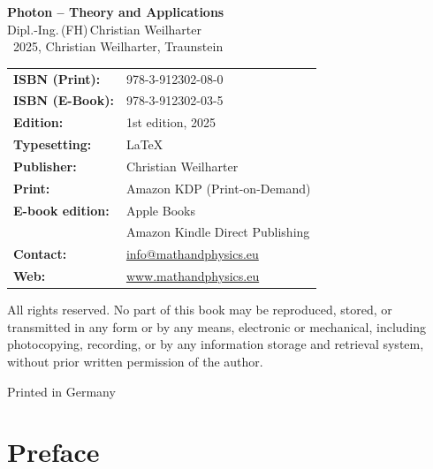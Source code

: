 \cleardoublepage
\thispagestyle{empty}
\begin{center}
	
	{\Large\textbf{Photon – Theory and Applications}}\\[1.2em]
	{\large Dipl.-Ing.\,(FH)\,Christian Weilharter}\\[1.2em]
	\textcopyright~2025, Christian Weilharter, Traunstein\\[2em]
\end{center}

\begin{flushleft}
	\begin{tabular}{@{}l l}
		\textbf{ISBN (Print):} & 978-3-912302-08-0 \\[0.5em]
		\textbf{ISBN (E-Book):} & 978-3-912302-03-5 \\[0.5em]
		\textbf{Edition:} & 1st edition, 2025 \\[0.5em]
		\textbf{Typesetting:} & \LaTeX \\[0.5em]
		\textbf{Publisher:} & Christian Weilharter \\[0.5em]

		\textbf{Print:} & Amazon KDP (Print-on-Demand) \\[0.5em]
		\textbf{E-book edition:} & Apple Books \\[0.5em]
		& Amazon Kindle Direct Publishing \\[0.5em]
		\textbf{Contact:} & \href{mailto:info@mathandphysics.de}{info@mathandphysics.eu} \\[0.5em]
		\textbf{Web:} & \href{https://www.mathandphysics.de}{www.mathandphysics.eu} \\

	\end{tabular}
\end{flushleft}

\vspace{2em}
\noindent
All rights reserved. No part of this book may be reproduced, stored, or transmitted
in any form or by any means, electronic or mechanical, including photocopying,
recording, or by any information storage and retrieval system, without prior written
permission of the author.

\begin{center}\small Printed in Germany\end{center}

\cleardoublepage


\chapter*{Preface}



